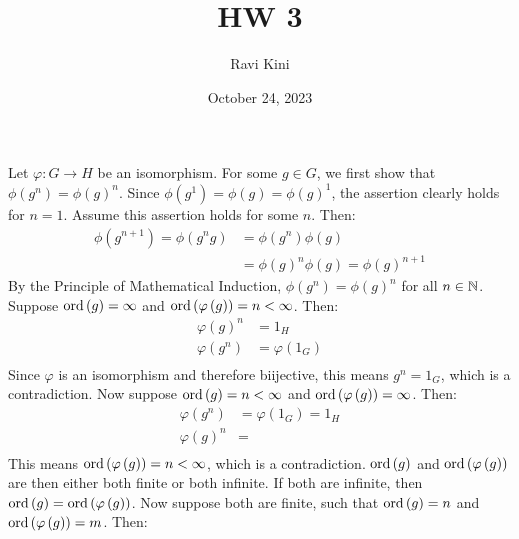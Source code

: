 \documentclass{article}
\title{HW 3}
\author{Ravi Kini}
\date{October 24, 2023}
\begin{document}
\maketitle

\problem
Let $\varphi: G \to H$ be an isomorphism. For some $g \in G$, we first show that $\phi\left(g^n\right) = \phi\left(g\right)^n$. Since $\phi\left(g^1\right) = \phi\left(g\right) = \phi\left(g\right)^1$, the assertion clearly holds for $n = 1$. Assume this assertion holds for some $n$. Then:
\begin{equation}
    \begin{split}
        \phi\left(g^{n+1}\right) = \phi\left(g^ng\right) & = \phi\left(g^n\right)\phi\left(g\right) \\
        & = \phi\left(g\right)^n\phi\left(g\right) = \phi\left(g\right)^{n+1}
    \end{split}
\end{equation}
By the Principle of Mathematical Induction, $\phi\left(g^n\right) = \phi\left(g\right)^n$ for all $n \in \mathbb{N}$.
Suppose $\operatorname{ord}\left(g\right) = \infty$ and $\operatorname{ord}\left(\varphi\left(g\right)\right) = n < \infty$. Then:
\begin{equation}
    \begin{split}
        \varphi\left(g\right)^n & = 1_H \\
        \varphi\left(g^n\right) & = \varphi\left(1_G\right) \\
    \end{split}
\end{equation}
Since  $\varphi$ is an isomorphism and therefore biijective, this means $g^n = 1_G$, which is a contradiction. Now suppose $\operatorname{ord}\left(g\right) = n < \infty$ and $\operatorname{ord}\left(\varphi\left(g\right)\right) = \infty$. Then:
\begin{equation}
    \begin{split}
        \varphi\left(g^n\right) & = \varphi\left(1_G\right) = 1_H \\
        \varphi\left(g\right)^n & = \\
    \end{split}
\end{equation}
This means $\operatorname{ord}\left(\varphi\left(g\right)\right) = n < \infty$, which is a contradiction. $\operatorname{ord}\left(g\right)$ and $\operatorname{ord}\left(\varphi\left(g\right)\right)$ are then either both finite or both infinite. If both are infinite, then $\operatorname{ord}\left(g\right) = \operatorname{ord}\left(\varphi\left(g\right)\right)$. Now suppose both are finite, such that $\operatorname{ord}\left(g\right) = n$ and $\operatorname{ord}\left(\varphi\left(g\right)\right) = m$. Then:
\end{document}
